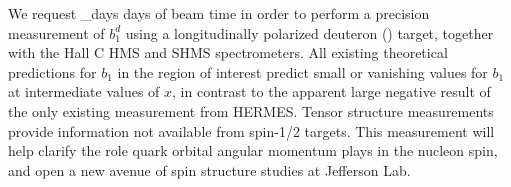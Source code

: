 
We request \total_days days of beam time in order to perform a 
precision measurement of $b_1^d$ using a longitudinally polarized deuteron 
(\TARGET) target, together with the Hall C HMS and SHMS spectrometers.
All existing theoretical predictions for $b_1$ in the region of interest predict small or vanishing
values for $b_1$  at intermediate values of $x$, in contrast to the apparent large negative result of the only existing measurement from HERMES. Tensor structure measurements provide information not available from spin-1/2 targets. This measurement will help clarify the role quark orbital angular momentum plays in the nucleon spin, and open a new avenue of spin structure studies at Jefferson Lab.


